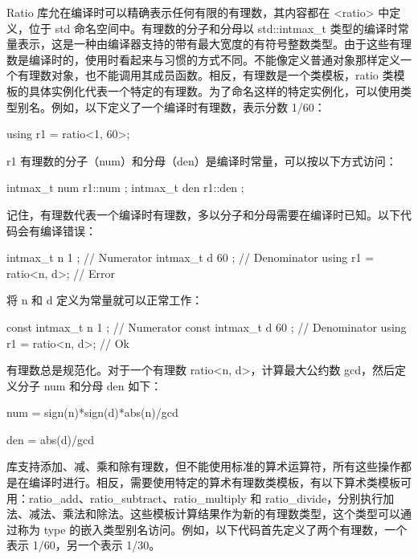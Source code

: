 Ratio 库允在编译时可以精确表示任何有限的有理数，其内容都在 <ratio> 中定义，位于 std 命名空间中。有理数的分子和分母以 std::intmax\_t 类型的编译时常量表示，这是一种由编译器支持的带有最大宽度的有符号整数类型。由于这些有理数是编译时的，使用时看起来与习惯的方式不同。不能像定义普通对象那样定义一个有理数对象，也不能调用其成员函数。相反，有理数是一个类模板，ratio 类模板的具体实例化代表一个特定的有理数。为了命名这样的特定实例化，可以使用类型别名。例如，以下定义了一个编译时有理数，表示分数 1/60：

\begin{cpp}
using r1 = ratio<1, 60>;
\end{cpp}

r1 有理数的分子（num）和分母（den）是编译时常量，可以按以下方式访问：

\begin{cpp}
intmax_t num { r1::num };
intmax_t den { r1::den };
\end{cpp}

记住，有理数代表一个编译时有理数，多以分子和分母需要在编译时已知。以下代码会有编译错误：

\begin{cpp}
intmax_t n { 1 }; // Numerator
intmax_t d { 60 }; // Denominator
using r1 = ratio<n, d>; // Error
\end{cpp}

将 n 和 d 定义为常量就可以正常工作：

\begin{cpp}
const intmax_t n { 1 }; // Numerator
const intmax_t d { 60 }; // Denominator
using r1 = ratio<n, d>; // Ok
\end{cpp}

有理数总是规范化。对于一个有理数 ratio<n, d>，计算最大公约数 gcd，然后定义分子 num 和分母 den 如下：

\begin{cpp}
num = sign(n)*sign(d)*abs(n)/gcd
\end{cpp}

\begin{cpp}
den = abs(d)/gcd
\end{cpp}

库支持添加、减、乘和除有理数，但不能使用标准的算术运算符，所有这些操作都是在编译时进行。相反，需要使用特定的算术有理数类模板，有以下算术类模板可用：ratio\_add、ratio\_subtract、ratio\_multiply 和 ratio\_divide，分别执行加法、减法、乘法和除法。这些模板计算结果作为新的有理数类型，这个类型可以通过称为 type 的嵌入类型别名访问。例如，以下代码首先定义了两个有理数，一个表示 1/60，另一个表示 1/30。

